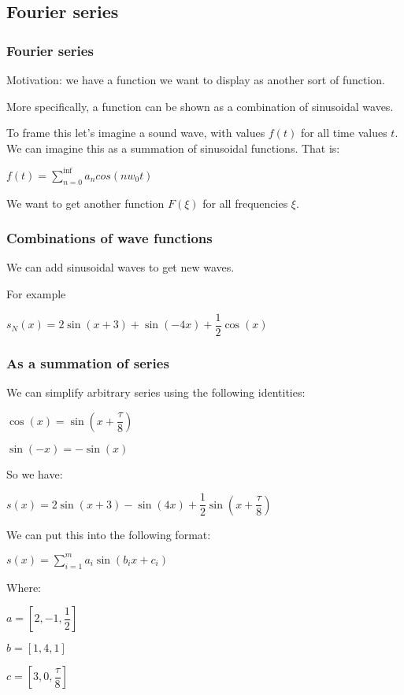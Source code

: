 
\subsection{Fourier series}

\subsubsection{Fourier series}

Motivation: we have a function we want to display as another sort of function.

More specifically, a function can be shown as a combination of sinusoidal waves.

To frame this let’s imagine a sound wave, with values \(f(t)\) for all time values \(t\). We can imagine this as a summation of sinusoidal functions. That is:

\(f(t)=\sum_{n=0}^{\inf } a_ncos(nw_0t)\)

We want to get another function \(F(\xi )\) for all frequencies \(\xi \).

\subsubsection{Combinations of wave functions}

We can add sinusoidal waves to get new waves.

For example

\(s_N(x)=2\sin(x+3)+\sin(-4x)+\dfrac{1}{2}\cos(x)\)

\subsubsection{As a summation of series}

We can simplify arbitrary series using the following identities:

\(\cos(x)=\sin(x+\dfrac{\tau }{8})\)

\(\sin(-x)=-\sin(x)\)

So we have:

\(s(x)=2\sin(x+3)-\sin(4x)+\dfrac{1}{2}\sin(x+\dfrac{\tau }{8})\)

We can put this into the following format:

\(s(x)=\sum^m_{i=1}a_i\sin(b_ix+c_i)\)

Where:

\(a=[2,-1,\dfrac{1}{2}]\)

\(b=[1,4,1]\)

\(c=[3,0,\dfrac{\tau}{8}]\)

